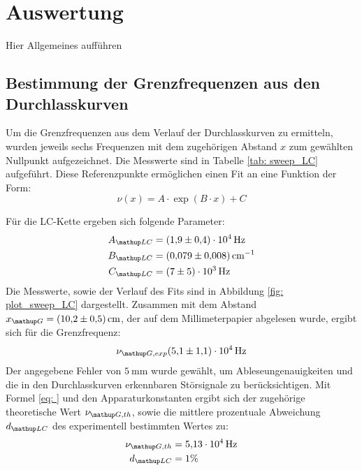 \section{Auswertung}
Hier Allgemeines aufführen

\subsection{Bestimmung der Grenzfrequenzen aus den Durchlasskurven}
Um die Grenzfrequenzen aus dem Verlauf der Durchlasskurven zu ermitteln, wurden jeweils sechs
Frequenzen mit dem zugehörigen Abstand $x$ zum gewählten Nullpunkt aufgezeichnet. Die Messwerte
sind in Tabelle \ref{tab: sweep_LC} aufgeführt. Diese Referenzpunkte ermöglichen einen Fit an eine Funktion der Form:
\begin{equation}
  \nu(x) = A \cdot \exp(B\cdot x) + C
  \label{eq: exp_fit}
\end{equation}
\FloatBarrier

Für die LC-Kette ergeben sich folgende Parameter:
\begin{align}
  \begin{aligned}
    A\ua{LC} &= \SI{1.9(4)e4}{\hertz}\\
    B\ua{LC} &= \SI{0.079(8)}{\cm^{-1}}\\
    C\ua{LC} &= \SI{7(5)e3}{\hertz}
  \end{aligned}
  \label{eq: params_LC}
\end{align}
Die Messwerte, sowie der Verlauf des Fits sind in Abbildung \ref{fig: plot_sweep_LC} dargestellt. Zusammen
mit dem Abstand $x\ua{G} = \SI{10.2(5)}{cm}$, der auf dem Millimeterpapier abgelesen wurde, ergibt sich
für die Grenzfrequenz:
\begin{equation}
  \nu\ua{G, exp}\SI{5.1(11)e4}{\hertz}
  \label{eq: nu_g_LC}
\end{equation}
Der angegebene Fehler von $\SI{5}{\milli\meter}$ wurde gewählt, um Ableseungenauigkeiten und die in den Durchlasskurven
erkennbaren Störsignale zu berücksichtigen.
Mit Formel \eqref{eq: } und den Apparaturkonstanten ergibt sich der zugehörige theoretische Wert $\nu\ua{G, th}$, sowie die
mittlere prozentuale Abweichung $d\ua{LC}$ des experimentell bestimmten Wertes zu:
\begin{align}
  \nu\ua{G, th} &= \SI{5.13e4}{\hertz} \\
  d\ua{LC} &= 1 \%
\end{align}
\FloatBarrier

